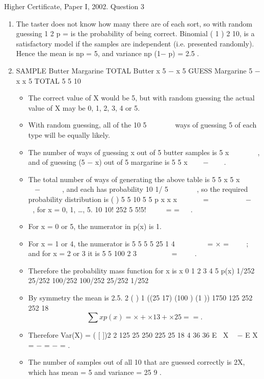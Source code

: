\documentclass[a4paper,12pt]{article}
\begin{document}
Higher Certificate, Paper I, 2002. Question 3

\begin{enumerate}
\item The taster does not know how many there are of each sort, so with random
guessing 1
2 p = is the probability of being correct. Binomial ( 1 )
2 10, is a satisfactory
model if the samples are independent (i.e. presented randomly). Hence the mean is np
= 5, and variance np (1− p) = 2.5 .
\item  SAMPLE
Butter Margarine TOTAL
Butter x 5 − x 5
GUESS Margarine 5 − x x 5
TOTAL 5 5 10

\begin{itemize}
\item The correct value of X would be 5, but with random guessing the actual value of X
may be 0, 1, 2, 3, 4 or 5.
\item With random guessing, all of the
10
5
 
 
 
ways of guessing 5
of each type will be equally likely. 
\item The number of ways of guessing x out of 5 butter
samples is
5
x
 
 
 
, and of guessing (5 − x) out of 5 margarine is
5
5 x
 
 −   
. 
\item The total
number of ways of generating the above table is
5 5
x 5 x
  
  −    
, and each has probability
10
1/
5
 
 
 
, so the required probability distribution is ( ) 5 5 10
5 5
p x
x x
    
=        −   
, for
x = 0, 1, …, 5.
10 10! 252
5 5!5!
 
  = =
 
. 
\item For x = 0 or 5, the numerator in p(x) is 1. \item For x = 1 or 4, the
numerator is
5 5
5 5 25
1 4
  
   = × =
  
; and for x = 2 or 3 it is
5 5
100
2 3
  
    =
  
. 
\end{itemize}
\begin{itemize}
    \item Therefore the
probability mass function for x is
x 0 1 2 3 4 5
p(x) 1/252 25/252 100/252 100/252 25/252 1/252
\item By symmetry the mean is 2.5.
2 ( ) 1 ((25 17) (100 ) (1 )) 1750 125
252 252 18
\[ \sum x p(x) = × + ×13 + × 25 = = .\]
\item Therefore Var(X) = ( [ ])2 2 125 25 250 225 25
18 4 36 36
E X  − E X = − = − = .
\item The number of samples out of all 10 that are guessed correctly is 2X, which has mean
= 5 and variance = 25
9
.
\end{itemize}

\end{enumerate}
\end{document}
